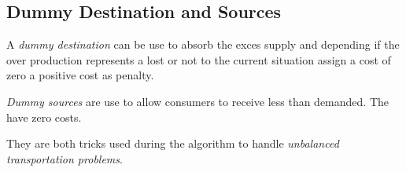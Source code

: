 \subsection{Dummy Destination and Sources}

A \emph{dummy destination} can be use to absorb the exces supply and depending if the over production represents a lost or not to the current situation
assign a cost of zero a positive cost as penalty.

\emph{Dummy sources} are use to allow consumers to receive less than demanded. The have zero costs.

They are both tricks used during the algorithm to handle \emph{unbalanced transportation problems}.

